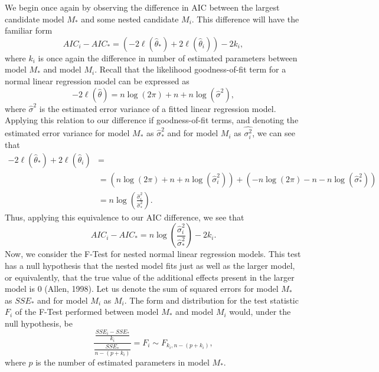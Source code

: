 We begin once again by observing the difference in AIC between the largest candidate model $M_*$ and some nested candidate $M_i$. This difference
will have the familiar form
\begin{equation}
	AIC_i - AIC_* = \left( -2 \ell (\hat{\theta}_*) + 2 \ell (\hat{\theta}_i) \right) - 2k_i ,
\end{equation}
where $k_i$ is once again the difference in number of estimated parameters between model $M_*$ and model $M_i$. Recall that the likelihood
goodness-of-fit term for a normal linear regression model can be expressed as
\begin{equation}
	-2 \ell (\hat{\theta}) = n \log(2 \pi) + n + n \log(\hat{\sigma} ^2 ) ,
\end{equation}
where $\hat{\sigma} ^2$ is the estimated error variance of a fitted linear regression model. Applying this relation to our difference if goodness-of-fit
terms, and denoting the estimated error variance for model $M_*$ as $\hat{\sigma}_* ^2$ and for model $M_i$ as $\hat{\sigma^2_i}$, we can see that
\begin{equation}
	\begin{split}
	-2 \ell (\hat{\theta}_*) + 2 \ell (\hat{\theta}_i) & = \\ 
	& = (n\log(2\pi) + n + n\log(\hat{\sigma}^2_i)) + (-n\log(2\pi) - n - n\log(\hat{\sigma}^2_*)) \\
	& = n\log(\frac{\hat{\sigma}^2_i}{\hat{\sigma}^2_*}) .
	\end{split}
\end{equation}
Thus, applying this equivalence to our AIC difference, we see that
\begin{equation}
	AIC_i - AIC_* = n\log(\frac{\hat{\sigma}^2_i}{\hat{\sigma}^2_*}) - 2k_i .
\end{equation}
Now, we consider the F-Test for nested normal linear regression models. This test has a null hypothesis that the nested model fits just as well as the
larger model, or equivalently, that the true value of the additional effects present in the larger model is 0 (Allen, 1998). Let us denote the sum
of squared errors for model $M_*$ as $SSE_*$ and for model $M_i$ as $M_i$. The form and distribution for the test statistic $F_i$ of the F-Test 
performed between model $M_*$ and model $M_i$ would, under the null hypothesis, be
\begin{equation}
	\frac{\frac{SSE_i - SSE_*}{k_i}}{\frac{SSE_*}{n-(p+k_i)}} = F_i \sim F_{k_i, n-(p+k_i)} ,
\end{equation}
where $p$ is the number of estimated parameters in model $M_*$.

